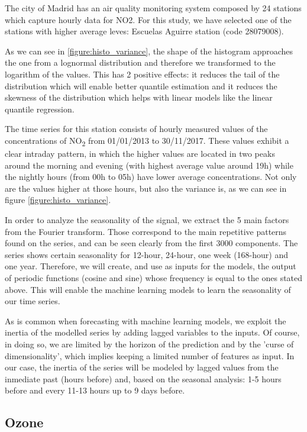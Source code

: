 \documentclass[a4paper,twocolumn,5p]{elsarticle}
\begin{document}
The city of Madrid has an air quality monitoring system composed by 24
stations which capture hourly data for NO2.  For this study, we 
have selected one of
the stations with higher average leves: 
Escuelas Aguirre station (code
28079008).

As we can see in \ref{figure:histo_variance}, the shape of the histogram
approaches the one from a lognormal distribution and therefore we
transformed to the logarithm of the values. This has 2 positive
effects: it reduces the tail of the distribution which will enable
better quantile estimation and it reduces the skewness of the
distribution which helps with linear models like the linear quantile
regression.

The time series for this station consists of hourly measured values of
the concentrations of NO\textsubscript{2} from 01/01/2013 to
30/11/2017. These values exhibit a clear intraday pattern, in which
the higher values are located in two peaks around the morning and
evening (with highest average value around 19h) while the nightly
hours (from 00h to 05h) have lower average concentrations.  Not only
are the values higher at those hours, but also the variance is, as we
can see in figure \ref{figure:histo_variance}.
 
In order to analyze the seasonality of the signal, we extract the 5
main factors from the Fourier transform. Those correspond to the main
repetitive patterns found on the series, and can be seen clearly from
the first 3000 components. The series shows certain seasonality for
12-hour, 24-hour, one week (168-hour) and one year.  Therefore, we will
create, and use as inputs for the models, the output of periodic
functions (cosine and sine) whose frequency is equal to the ones
stated above. This will enable the machine learning models to learn
the seasonality of our time series.

As is common when forecasting with machine learning models, we exploit
the inertia of the modelled series by adding lagged variables to the
inputs. Of course, in doing so, we are limited by the horizon of the
prediction and by the 'curse of dimensionality', which implies keeping
a limited number of features as input. In our case, the inertia of the
series will be modeled by lagged values from the inmediate past (hours
before) and, based on the seasonal analysis: 1-5 hours before and
every 11-13 hours up to 9 days before.

\subsection{Ozone}
\end{document}

